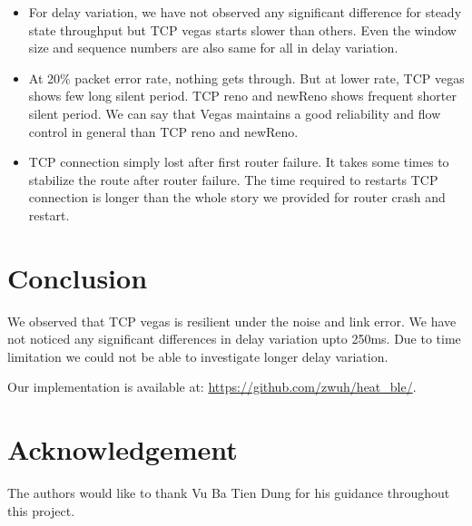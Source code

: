 \documentclass[conference,a4paper]{../../sty/IEEEtran}
\begin{document}
\begin{itemize}
 \item For delay variation, we have not observed any significant difference for steady state throughput but TCP vegas starts slower than others. Even the window size and sequence numbers are also same for all in delay variation.
 \item At 20$\%$ packet error rate, nothing gets through. But at lower rate, TCP vegas shows few long silent period. TCP reno and newReno shows frequent shorter silent period. We can say that Vegas maintains a good reliability and flow control in general than TCP reno and newReno.
 \item TCP connection simply lost after first router failure. It takes some times to stabilize the route after router failure. The time required to restarts TCP connection is longer than the whole story we provided for router crash and restart.
 
\end{itemize}


\section{Conclusion}
We observed that TCP vegas is resilient under the noise and link error. We have not noticed any significant differences in delay variation upto 250ms. Due to time limitation we could not be able to investigate longer delay variation. 

Our implementation is available at: \url{https://github.com/zwuh/heat_ble/}.


\section*{Acknowledgement}
The authors would like to thank Vu Ba Tien Dung for his guidance throughout this project.




\nocite*{}


\end{document}
